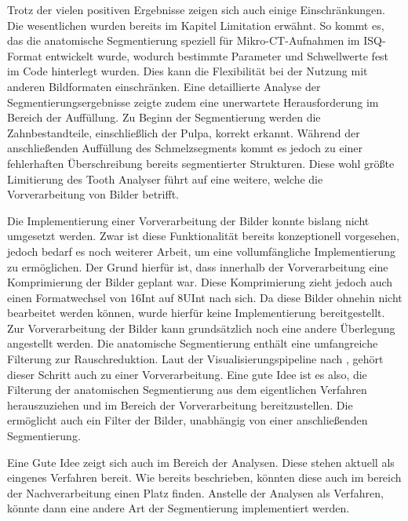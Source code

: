 Trotz der vielen positiven Ergebnisse zeigen sich auch einige Einschränkungen. Die
wesentlichen wurden bereits im Kapitel Limitation erwähnt. So kommt es, das die anatomische
Segmentierung speziell für Mikro-\ac{CT}-Aufnahmen im \ac{ISQ}-Format entwickelt
wurde, wodurch bestimmte Parameter und Schwellwerte fest im Code hinterlegt
wurden. Dies kann die Flexibilität bei der Nutzung mit anderen Bildformaten einschränken.
Eine detaillierte Analyse der Segmentierungsergebnisse zeigte zudem eine
unerwartete Herausforderung im Bereich der Auffüllung. Zu Beginn der Segmentierung
werden die Zahnbestandteile, einschließlich der Pulpa, korrekt erkannt. Während
der anschließenden Auffüllung des Schmelzsegments kommt es jedoch zu einer
fehlerhaften Überschreibung bereits segmentierter Strukturen. Diese wohl größte Limitierung
des Tooth Analyser führt auf eine weitere, welche die Vorverarbeitung von Bilder
betrifft.

Die Implementierung einer Vorverarbeitung der Bilder konnte bislang nicht
umgesetzt werden. Zwar ist diese Funktionalität bereits konzeptionell vorgesehen,
jedoch bedarf es noch weiterer Arbeit, um eine vollumfängliche Implementierung zu
ermöglichen. Der Grund hierfür ist, dass innerhalb der Vorverarbeitung eine Komprimierung
der Bilder geplant war. Diese Komprimierung zieht jedoch auch einen
Formatwechsel von \ac{16Int} auf \ac{8UInt} nach sich. Da diese Bilder ohnehin nicht
bearbeitet werden können, wurde hierfür keine Implementierung bereitgestellt. Zur
Vorverarbeitung der Bilder kann grundsätzlich noch eine andere Überlegung angestellt
werden. Die anatomische Segmentierung enthält eine umfangreiche Filterung zur
Rauschreduktion. Laut der Visualisierungspipeline nach \citet[S.~50]{handels2000},
gehört dieser Schritt auch zu einer Vorverarbeitung. Eine gute Idee ist es also,
die Filterung der anatomischen Segmentierung aus dem eigentlichen Verfahren herauszuziehen
und im Bereich der Vorverarbeitung bereitzustellen. Die ermöglicht auch ein
Filter der Bilder, unabhängig von einer anschließenden Segmentierung.

Eine Gute Idee zeigt sich auch im Bereich der Analysen. Diese stehen aktuell als
eingenes Verfahren bereit. Wie bereits beschrieben, könnten diese auch im
bereich der Nachverarbeitung einen Platz finden. Anstelle der Analysen als Verfahren,
könnte dann eine andere Art der Segmentierung implementiert werden.

